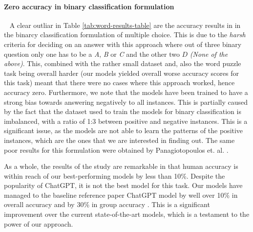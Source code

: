 \paragraph{Zero accuracy in binary classification formulation} \ %
A clear outliar in Table \ref{tab:word-results-table} are the accuracy results in in the binarcy classification formulation of multiple choice.
This is due to the \emph{harsh} criteria for deciding on an answer with this approach where out of three binary question only one has to be a \emph{A}, \emph{B} or \emph{C} and the other two $D$ \emph{(None of the above)}.
This, combined with the rather small dataset and, also the word puzzle task being overall harder (our models yielded overall worse accuracy scores for this task) meant that there were no cases where this approach worked, hence accuracy zero.
Furthermore, we note that the models have been trained to have a strong bias towards answering negatively to all instances.
This is partially caused by the fact that the dataset used to train the models for binary classification is imbalanced, with a ratio of 1:3 between positive and negative instances.
This is a significant issue, as the models are not able to learn the patterns of the positive instances, which are the ones that we are interested in finding out.
The same poor results for this formulation were obtained by Panagiotopoulos et. al. \citep{ails-lab}.

As a whole, the results of the study are remarkable in that human accuracy is within reach of our best-performing models by less than 10\%.
Despite the popularity of ChatGPT, it is not the best model for this task.
Our models have managed to the baseline reference paper ChatGPT model by well over 10\% in overall accuracy and by 30\% in group accuracy \citep{semeval}.
This is a significant improvement over the current state-of-the-art models, which is a testament to the power of our approach.
